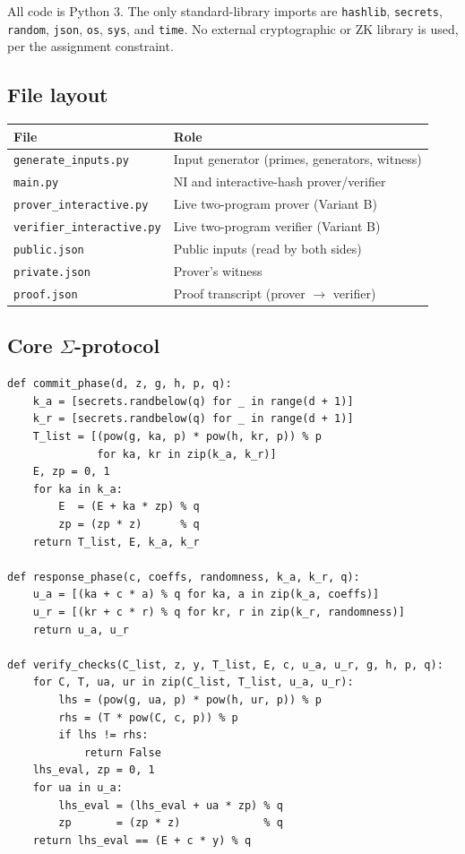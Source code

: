 \documentclass[11pt,a4paper]{article}
\begin{document}
All code is Python 3. The only standard-library imports are
\texttt{hashlib}, \texttt{secrets}, \texttt{random}, \texttt{json},
\texttt{os}, \texttt{sys}, and \texttt{time}. No external cryptographic
or ZK library is used, per the assignment constraint.

\subsection{File layout}

\begin{center}
\begin{tabular}{ll}
\toprule
\textbf{File} & \textbf{Role} \\
\midrule
\texttt{generate\_inputs.py}   & Input generator (primes, generators, witness)\\
\texttt{main.py}           & NI and interactive-hash prover/verifier\\
\texttt{prover\_interactive.py}    & Live two-program prover (Variant B)\\
\texttt{verifier\_interactive.py}  & Live two-program verifier (Variant B)\\
\texttt{public.json}           & Public inputs (read by both sides)\\
\texttt{private.json}          & Prover's witness\\
\texttt{proof.json}            & Proof transcript (prover $\to$ verifier)\\
\bottomrule
\end{tabular}
\end{center}

\subsection{Core $\Sigma$-protocol}

\begin{lstlisting}[style=pythonstyle, caption={Commit, response, and verification.}]
def commit_phase(d, z, g, h, p, q):
    k_a = [secrets.randbelow(q) for _ in range(d + 1)]
    k_r = [secrets.randbelow(q) for _ in range(d + 1)]
    T_list = [(pow(g, ka, p) * pow(h, kr, p)) % p
              for ka, kr in zip(k_a, k_r)]
    E, zp = 0, 1
    for ka in k_a:
        E  = (E + ka * zp) % q
        zp = (zp * z)      % q
    return T_list, E, k_a, k_r

def response_phase(c, coeffs, randomness, k_a, k_r, q):
    u_a = [(ka + c * a) % q for ka, a in zip(k_a, coeffs)]
    u_r = [(kr + c * r) % q for kr, r in zip(k_r, randomness)]
    return u_a, u_r

def verify_checks(C_list, z, y, T_list, E, c, u_a, u_r, g, h, p, q):
    for C, T, ua, ur in zip(C_list, T_list, u_a, u_r):
        lhs = (pow(g, ua, p) * pow(h, ur, p)) % p
        rhs = (T * pow(C, c, p)) % p
        if lhs != rhs:
            return False
    lhs_eval, zp = 0, 1
    for ua in u_a:
        lhs_eval = (lhs_eval + ua * zp) % q
        zp       = (zp * z)             % q
    return lhs_eval == (E + c * y) % q
\end{lstlisting}
\end{document}
